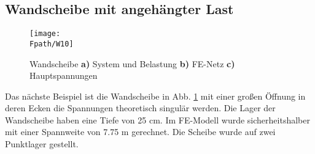 {%
{\textcolor{sectionTitleBlue}{\section{Wandscheibe mit angeh\"{a}ngter Last}}}
\begin{figure}[tbp] \centering
\if {} \sidecaption \fi
\texttt{[image: \\Fpath/W10]}
\caption{Wandscheibe {\bf a)} System und Belastung {\bf b)} FE-Netz {\bf c)}
Hauptspannungen} \label{W10}
\end{figure}%
Das n\"{a}chste Beispiel ist die Wandscheibe in Abb. \ref{W10} mit einer gro{\ss}en \"{O}ffnung in deren Ecken die Spannungen theoretisch singul\"{a}r werden. Die Lager der Wandscheibe haben eine Tiefe von 25 cm. Im FE-Modell wurde sicherheitshalber mit einer Spannweite von 7.75 m gerechnet. Die Scheibe wurde auf zwei Punktlager gestellt.

}
